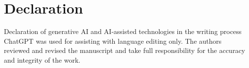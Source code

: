 \documentclass[runningheads]{llncs}
\begin{document}
\section*{Declaration}
Declaration of generative AI and AI-assisted technologies in the writing process ChatGPT was used for assisting with language editing only. The authors reviewed and revised the manuscript and take full responsibility for the accuracy and integrity of the work.



\end{document}
